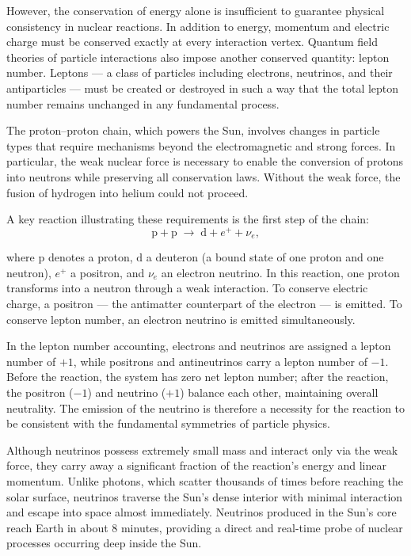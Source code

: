 However, the conservation of energy alone is insufficient to guarantee physical consistency in nuclear reactions. In addition to energy, momentum and electric charge must be conserved exactly at every interaction vertex. Quantum field theories of particle interactions also impose another conserved quantity: lepton number. Leptons — a class of particles including electrons, neutrinos, and their antiparticles — must be created or destroyed in such a way that the total lepton number remains unchanged in any fundamental process.

The proton–proton chain, which powers the Sun, involves changes in particle types that require mechanisms beyond the electromagnetic and strong forces. In particular, the weak nuclear force is necessary to enable the conversion of protons into neutrons while preserving all conservation laws. Without the weak force, the fusion of hydrogen into helium could not proceed.

A key reaction illustrating these requirements is the first step of the chain:
\[
\text{p} + \text{p} \;\to\; \text{d} + e^+ + \nu_e,
\]

where $\text{p}$ denotes a proton, $\text{d}$ a deuteron (a bound state of one proton and one neutron), $e^+$ a positron, and $\nu_e$ an electron neutrino. In this reaction, one proton transforms into a neutron through a weak interaction. To conserve electric charge, a positron — the antimatter counterpart of the electron — is emitted. To conserve lepton number, an electron neutrino is emitted simultaneously. 

In the lepton number accounting, electrons and neutrinos are assigned a lepton number of $+1$, while positrons and antineutrinos carry a lepton number of $-1$. Before the reaction, the system has zero net lepton number; after the reaction, the positron ($-1$) and neutrino ($+1$) balance each other, maintaining overall neutrality. The emission of the neutrino is therefore a necessity for the reaction to be consistent with the fundamental symmetries of particle physics.

Although neutrinos possess extremely small mass and interact only via the weak force, they carry away a significant fraction of the reaction's energy and linear momentum. Unlike photons, which scatter thousands of times before reaching the solar surface, neutrinos traverse the Sun’s dense interior with minimal interaction and escape into space almost immediately. Neutrinos produced in the Sun’s core reach Earth in about 8 minutes, providing a direct and real-time probe of nuclear processes occurring deep inside the Sun.

